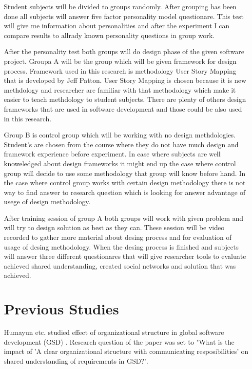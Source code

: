 \documentclass[english]{tktltiki2}
\theoremstyle{definition}
\theoremstyle{remark}
\begin{document}
Student subjects will be divided to groups randomly. After grouping has been done all subjects will answer five factor personality model questionare\cite{fiveFactor}. This test will give me information about personalities and after the experiment I can compare results to allrady known personality questions in group work.

After the personality test both groups will do design phase of the given software project. Groupa A will be the group which will be given framework for design process. Framework used in this research is methodology User Story Mapping that is developed by Jeff Patton\cite{userStoryMapping}. User Story Mapping is chosen because it is new methdology and researcher are familiar with that methodology which make it easier to teach methdology to student subjects. There are plenty of others design frameworks that are used in software development and those could be also used in this research.

Group B is control group which will be working with no design methdologies. Student's are chosen from the course where they do not have much design and framework experience before experiment. In case where subjects are well knoweledged about design frameworks it might end up the case where control group will decide to use some methodology that group will know before hand. In the case where control group works with certain design methodology there is not way to find answer to research question which is looking for answer advantage of usege of design methodology.

After training session of group A both groups will work with given problem and will try to design solution as best as they can. These session will be video recorded to gather more material about desing process and for evaluation of usage of desing methodology. When the desing process is finished and subjects will answer three different questionares that will give researcher tools to evaluate achieved shared understanding, created social networks and solution that was achieved.


\section{Previous Studies}

Humayun etc. studied effect of organizational structure in global software development (GSD) \cite{organizationalStructure}. Research question of the paper was set to "What is the impact of 'A clear organizational structure with communicating resposibilities' on shared understanding of requirements in GSD?".
\end{document}
